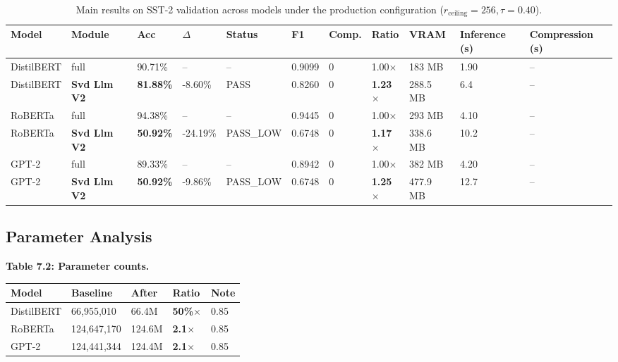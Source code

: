 \begin{table}[t]
\centering
\small
\begin{tabular}{lllllllllll}
\toprule
\textbf{Model} & \textbf{Module} & \textbf{Acc} & \textbf{$\Delta$} & \textbf{Status} & \textbf{F1} & \textbf{Comp.} & \textbf{Ratio} & \textbf{VRAM} & \textbf{Inference (s)} & \textbf{Compression (s)} \\
\midrule
DistilBERT & full & 90.71\% & -- & -- & 0.9099 & 0 & 1.00$\times$ & 183 MB & 1.90 & -- \\
DistilBERT & \textbf{Svd Llm V2} & \textbf{81.88\%} & -8.60\% & PASS & 0.8260 & 0 & \textbf{1.23$\times$} & 288.5 MB & 6.4 & -- \\
RoBERTa & full & 94.38\% & -- & -- & 0.9445 & 0 & 1.00$\times$ & 293 MB & 4.10 & -- \\
RoBERTa & \textbf{Svd Llm V2} & \textbf{50.92\%} & -24.19\% & PASS_LOW & 0.6748 & 0 & \textbf{1.17$\times$} & 338.6 MB & 10.2 & -- \\
GPT-2 & full & 89.33\% & -- & -- & 0.8942 & 0 & 1.00$\times$ & 382 MB & 4.20 & -- \\
GPT-2 & \textbf{Svd Llm V2} & \textbf{50.92\%} & -9.86\% & PASS_LOW & 0.6748 & 0 & \textbf{1.25$\times$} & 477.9 MB & 12.7 & -- \\
\bottomrule
\end{tabular}
\caption{Main results on SST-2 validation across models under the production configuration ($r_{\mathrm{ceiling}}=256, \tau=0.40$).}
\label{tab:main_sst2}
\end{table}

\subsection{Parameter Analysis}

\textbf{Table 7.2: Parameter counts.}

\begin{table}[H]
\centering
\small
\begin{tabular}{lllll}
\toprule
\textbf{Model} & \textbf{Baseline} & \textbf{After} & \textbf{Ratio} & \textbf{Note} \\
\midrule
DistilBERT & 66,955,010 & 66.4M & \textbf{50\%$\times$} & 0.85 \\
RoBERTa & 124,647,170 & 124.6M & \textbf{2.1$\times$} & 0.85 \\
GPT-2 & 124,441,344 & 124.4M & \textbf{2.1$\times$} & 0.85 \\
\bottomrule
\end{tabular}
\end{table}

